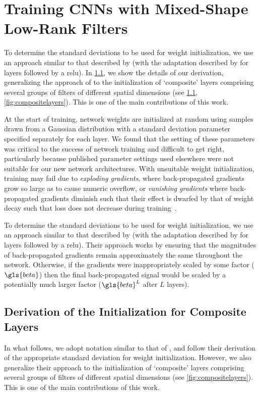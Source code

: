 \documentclass[thesis]{subfiles}
\begin{document}
    \section[Training CNNs with Mixed-Shape Low-Rank Filters]{Training CNNs with Mixed-Shape\texorpdfstring{\\}{ }Low-Rank Filters}\label{initialization}
    To determine the standard deviations to be used for weight initialization, we use an approach similar to that described by \citet{glorot2010understanding} (with the adaptation described by \citet{He2015b} for layers followed by a \gls{relu}). In \cref{initializationderivation}, we show the details of our derivation, generalizing the approach of \citet{He2015b} to the initialization of `composite' layers comprising several groups of filters of different spatial dimensions (see \cref{initializationderivation}, \cref{fig:compositelayers}). This is one of the main contributions of this work.
    
    At the start of training, network weights are initialized at random using samples drawn from a Gaussian distribution with a standard deviation parameter specified separately for each layer. We found that the setting of these parameters was critical to the success of network training and difficult to get right, particularly because published parameter settings used elsewhere were not suitable for our new network architectures. With unsuitable weight initialization, training may fail due to {\em exploding gradients}, where  back-propagated gradients grow so large as to cause numeric overflow, or {\em vanishing gradients} where back-propagated gradients diminish such that their effect is dwarfed by that of weight decay such that loss does not decrease during training~\citep{Hochreiter01gradientflow}.
    
    To determine the standard deviations to be used for weight initialization, we use an approach similar to that described by \citet{glorot2010understanding} (with the adaptation described by \citet{He2015b} for layers followed by a \gls{relu}). Their approach works by ensuring that the magnitudes of back-propagated gradients remain approximately the same throughout the network. Otherwise, if the gradients were inappropriately scaled by some factor (\eg $\gls{beta}$) then the final back-propagated signal would be scaled by a potentially much larger factor ($\gls{beta}^L$ after $L$ layers).
    
    \subsection{Derivation of the Initialization for Composite Layers}\label{initializationderivation}
    In what follows, we adopt notation similar to that of \citet{He2015b}, and follow their derivation of the appropriate standard deviation for weight initialization. However, we also generalize their approach to the initialization of `composite' layers comprising several groups of filters of different spatial dimensions (see \cref{fig:compositelayers}). This is one of the main contributions of this work.
    
\end{document}
